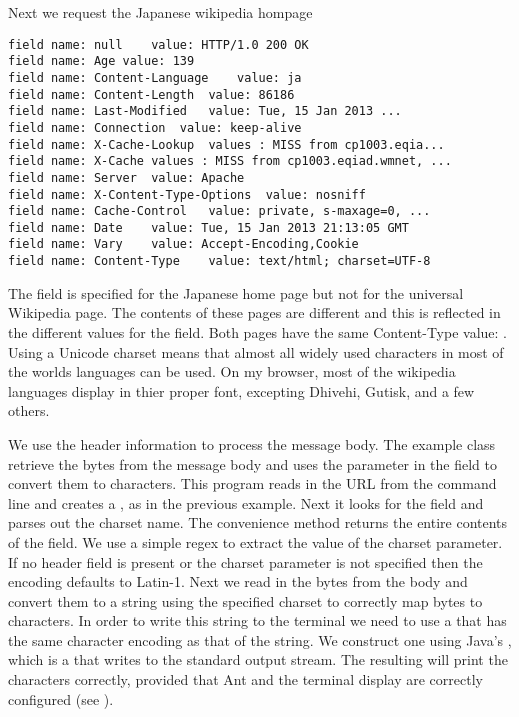 Next we request the Japanese wikipedia hompage
%
\begin{verbatim}
field name: null	value: HTTP/1.0 200 OK 
field name: Age	value: 139
field name: Content-Language	value: ja
field name: Content-Length	value: 86186
field name: Last-Modified	value: Tue, 15 Jan 2013 ...
field name: Connection	value: keep-alive
field name: X-Cache-Lookup	values : MISS from cp1003.eqia...
field name: X-Cache	values : MISS from cp1003.eqiad.wmnet, ...
field name: Server	value: Apache
field name: X-Content-Type-Options	value: nosniff
field name: Cache-Control	value: private, s-maxage=0, ...
field name: Date	value: Tue, 15 Jan 2013 21:13:05 GMT
field name: Vary	value: Accept-Encoding,Cookie
field name: Content-Type	value: text/html; charset=UTF-8
\end{verbatim}
%
The field  is specified for the Japanese home page
but not for the universal Wikipedia page.  The contents of these pages are different
and this is reflected in the different values for the  field.
Both pages have the same Content-Type value: .
Using a Unicode charset means that almost all widely used characters in most of the
worlds languages can be used.
On my browser, most of the wikipedia languages display in thier proper font, excepting
Dhivehi, Gutisk, and a few others.

We use the header information to process the message body.
The example class  retrieve the bytes from the message body and
uses the  parameter in the  field to convert them
to characters.  
%
%
This program reads in the URL from the command line and creates a ,
as in the previous example.  Next it looks for the  field and
parses out the charset name.
%
%
The convenience method  returns the entire contents
of the  field.
We use a simple regex to extract the value of the charset parameter.
If no header field is present or the charset parameter is not specified
then the encoding defaults to Latin-1.
%
%
Next we read in the bytes from the body and convert them to a string
using the specified charset to correctly map bytes to characters.
%
%
In order to write this string to the terminal we need to use a 
that has the same character encoding as that of the string.
We construct one using Java's , which is a 
that writes to the standard output stream.
The resulting  will print the characters correctly,
provided that Ant and the terminal display are correctly configured (see ).

